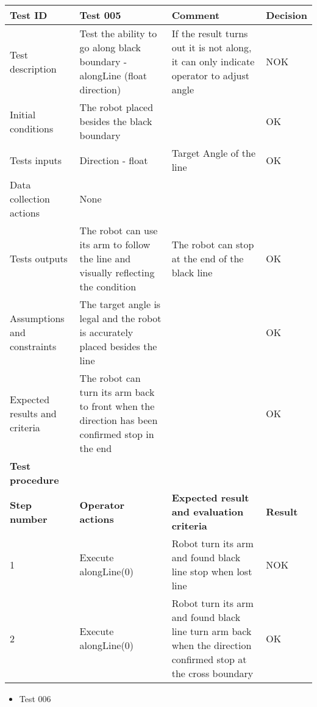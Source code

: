 \documentclass[11pt, a4paper]{article}
\begin{document}
\begin{tabular} 
	 {|p{4cm}|p{4.5cm}|p{4.5cm}|p{1.5cm}|}
\hline
\textbf{Test ID} & \textbf{Test 005} & \textbf{Comment} & \textbf{Decision}\\
\hline
{Test description} & {Test the ability to go along black boundary - alongLine \newline (float direction)} & {If the result turns out it is not along, it can only indicate \newline operator to adjust angle} & {NOK}\\
\hline
{Initial conditions} & {The robot placed besides the black boundary} & {} & {OK}\\
\hline
{Tests inputs} & {Direction - float} & {Target Angle of the line} & {OK}\\
\hline
{Data collection actions} & {None} & {} & {}\\
\hline
{Tests outputs} & {The robot can use its arm to \newline follow the line and visually \newline reflecting the condition} & {The robot can stop at the end of the black line} & {OK}\\
\hline
{Assumptions and constraints} & {The target angle is legal and the robot is accurately placed \newline besides the line} & {} & {OK}\\
\hline
{Expected results and criteria} & {The robot can turn its arm back to front when the direction has been confirmed stop in the end} & {} & {OK}\\
\hline
\textbf{Test procedure} & \textbf{} & \textbf{} & \textbf{}\\
\hline
\textbf{Step number} & \textbf{Operator actions} & \textbf{Expected result and \newline evaluation criteria} & \textbf{Result}\\
\hline
{1} & {Execute \newline alongLine(0)} & {Robot turn its arm and found black line stop when lost line} & {NOK}\\
\hline
{2} & {Execute \newline alongLine(0)} & {Robot turn its arm and found black line turn arm back when the direction confirmed stop at the cross boundary} & {OK}\\
\hline
\end{tabular}
\newpage

\begin{itemize}
\item {Test 006}\\
\end{itemize}
\end{document}
